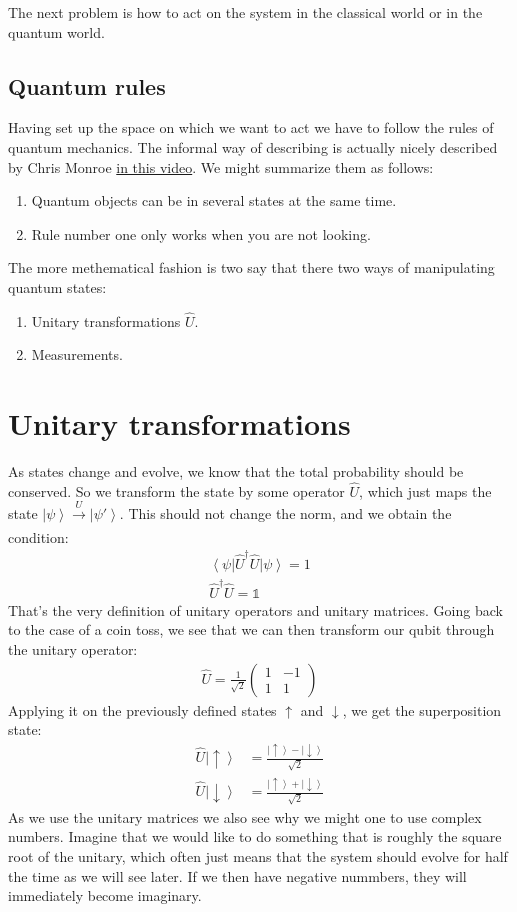 \documentclass[10pt]{article}
\newcommand{\bra}[1]{\ensuremath{\left\langle#1\right|}}
\newcommand{\ket}[1]{\ensuremath{\left|#1\right\rangle}}
\begin{document}
The next problem is how to act on the system in the classical world or in the quantum world.


\subsection{Quantum rules}
Having set up the space on which we want to act we have to follow the rules of quantum mechanics. The informal way of describing is actually nicely described by Chris Monroe \href{https://youtu.be/CC7nlBM2cSM}{in this video}. We might summarize them as follows:
\begin{enumerate}
\item Quantum objects can be in several states at the same time.
\item Rule number one only works when you are not looking.
\end{enumerate}

The more methematical fashion is two say that there two ways of manipulating quantum states:
\begin{enumerate}
\item Unitary transformations $\hat{U}$.
\item Measurements.
\end{enumerate}

\section{Unitary transformations}
As states change and evolve, we know that the total probability should be conserved. So we transform the state by some operator $\hat{U}$, which just maps the state $\ket{\psi}\xrightarrow[]{U}\ket{\psi'}$. This should not change the norm, and we obtain the condition:
\begin{align}
\bra{\psi}\hat{U}^\dag\hat{U} \ket{\psi} = 1\\
\hat{U}^\dag\hat{U}  = \mathbb{1}
\end{align}
That's the very definition of unitary operators and unitary matrices.
Going back to the case of a coin toss, we see that we can then transform our qubit through the unitary operator:
\begin{align}
\hat{U}=\frac{1}{\sqrt{2}}\left(\begin{array}{cc}
1 & -1\\
1 & 1
\end{array}\right)
\end{align}
Applying it on the previously defined states $\uparrow$ and $\downarrow$, we get the superposition state:
\begin{align}
\hat{U}\ket{\uparrow} &= \frac{\ket{\uparrow}-\ket{\downarrow}}{\sqrt{2}}\\
\hat{U}\ket{\downarrow} &= \frac{\ket{\uparrow}+\ket{\downarrow}}{\sqrt{2}}
\end{align}
As we use the unitary matrices we also see why we might one to use complex numbers. Imagine that we would like to do something that is roughly the square root of the unitary, which often just means that the system should evolve for half the time as we will see later. If we then have negative nummbers, they will immediately become imaginary.
\end{document}
